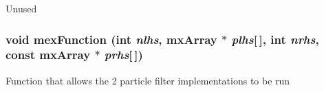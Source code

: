 \label{ex__particle__CUDA__naive_8cu_ae66f6b31b5ad750f1fe042a706a4e3d4}
Unused \hypertarget{ex__particle__CUDA__naive_8cu_a6a215cbfde54f82a3ce599228fc3fce5}{
\subsubsection[{mexFunction}]{\setlength{\rightskip}{0pt plus 5cm}void mexFunction (int {\em nlhs}, \/  mxArray $\ast$ {\em plhs}\mbox{[}$\,$\mbox{]}, \/  int {\em nrhs}, \/  const mxArray $\ast$ {\em prhs}\mbox{[}$\,$\mbox{]})}}
\label{ex__particle__CUDA__naive_8cu_a6a215cbfde54f82a3ce599228fc3fce5}
Function that allows the 2 particle filter implementations to be run

